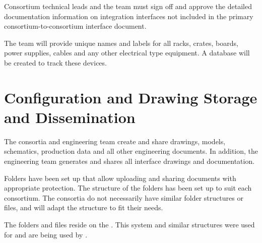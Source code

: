Consortium technical leads and the  team must sign off
and approve the detailed documentation information on integration
interfaces not included in the primary consortium-to-consortium
interface document.

The  team will provide unique names and labels
for all racks, crates, boards, power supplies, cables and any other
electrical type equipment.  A database will be created to track these
devices.

\section{Configuration and Drawing Storage and Dissemination}
\label{sec:fdsp-coord-integ-modelplan}

The consortia and  engineering team create and share
drawings, models, schematics, production data and all other
engineering documents. In addition, the  engineering team
generates and shares all interface drawings and documentation.


Folders have been set up that allow uploading and sharing documents
with appropriate protection. The structure of the folders has been set
up to suit each consortium. The consortia do not necessarily have
similar folder structures or files, and will adapt the structure to fit
their needs.


The folders and files reside on the . This system and
similar structures were used for  and are being
used by .


